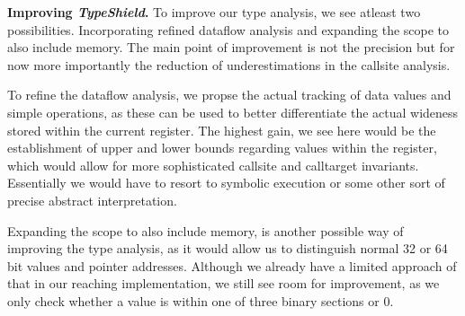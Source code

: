 \textbf{Improving \textit{TypeShield}.}
\label{section:venuesimp}
To improve our type analysis, we see atleast two possibilities. Incorporating refined dataflow analysis and 
expanding the scope to also include memory. The main point of improvement is not the precision but for now 
more importantly the reduction of underestimations in the callsite analysis.

To refine the dataflow analysis, we propse the actual tracking of data values and simple operations, as these
can be used to better differentiate the actual wideness stored within the current register. The highest gain, 
we see here would be the establishment of upper and lower bounds regarding values within the register, which 
would allow for more sophisticated callsite and calltarget invariants. Essentially we would have to resort 
to symbolic execution or some other sort of precise abstract interpretation.

Expanding the scope to also include memory, is another possible way of improving the type analysis, as it 
would allow us to distinguish normal 32 or 64 bit values and pointer addresses. Although we already have a 
limited approach of that in our reaching implementation, we still see room for improvement, as we only check
whether a value is within one of three binary sections or 0.
